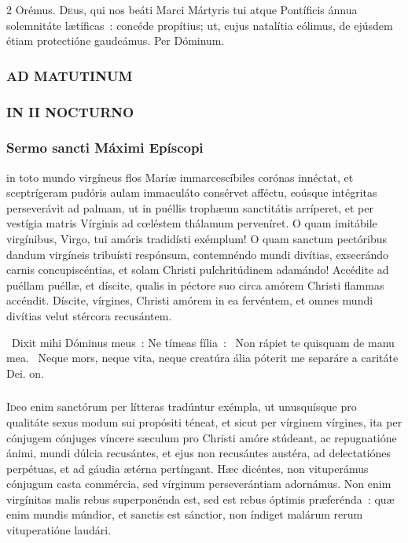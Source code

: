 \documentclass[9pt,twoside]{extarticle}
\begin{document}
\begin{multicols}{2}
\smallskip
Orémus. \hfill {}
\lettrine{D}eus, qui nos beáti Marci Mártyris tui atque Pontíficis ánnua solemnitáte lætíficas~: concéde propítius; ut, cujus natalítia cólimus, de ejúsdem étiam protectióne gaudeámus. Per Dóminum.

\subsubsection*{\center \normalfont \textsc{AD MATUTINUM}}
\small {}

\normalsize
\subsubsection*{\center \normalfont \small \textsc{IN II NOCTURNO}}
\subsubsection*{\center \normalfont Sermo sancti Máximi Epíscopi\\ \small {}}
 in toto mundo virgíneus flos Maríæ immarcescíbiles corónas innéctat, et sceptrígeram pudóris aulam immaculáto consérvet afféctu, eoúsque intégritas perseverávit ad palmam, ut in puéllis trophæum sanctitátis arríperet, et per vestígia matris Vírginis ad cœléstem thálamum perveníret. O quam imitábile virgínibus, Virgo, tui amóris tradidísti exémplum! O quam sanctum pectóribus dandum virgíneis tribuísti respónsum, contemnéndo mundi divítias, exsecrándo carnis concupiscéntias, et solam Christi pulchritúdinem adamándo! Accédite ad puéllam puéllæ, et díscite, qualis in péctore suo circa amórem Christi flammas accéndit. Díscite, vírgines, Christi amórem in ea fervéntem, et omnes mundi divítias velut stércora recusántem.

~Dixit mihi Dóminus meus~: Ne tímeas fília~: \textred{*}~Non rápiet te quisquam de manu mea. ~Neque mors, neque vita, neque creatúra ália póterit me separáre a caritáte Dei. on.

\subsubsection*{\center \normalfont {}}
\lettrine{I}deo enim sanctórum per lítteras tradúntur exémpla, ut unusquísque pro qualitáte sexus modum sui propósiti téneat, et sicut per vírginem vírgines, ita per cónjugem cónjuges víncere sæculum pro Christi amóre stúdeant, ac repugnatióne ánimi, mundi dúlcia recusántes, et ejus non recusántes austéra, ad delectatiónes perpétuas, et ad gáudia ætérna pertíngant. Hæc dicéntes, non vituperámus cónjugum casta commércia, sed vírginum perseverántiam adornámus. Non enim virgínitas malis rebus superponénda est, sed est rebus óptimis præferénda~: quæ enim mundis múndior, et sanctis est sánctior, non índiget malárum rerum vituperatióne laudári.


\end{multicols}
\end{document}
